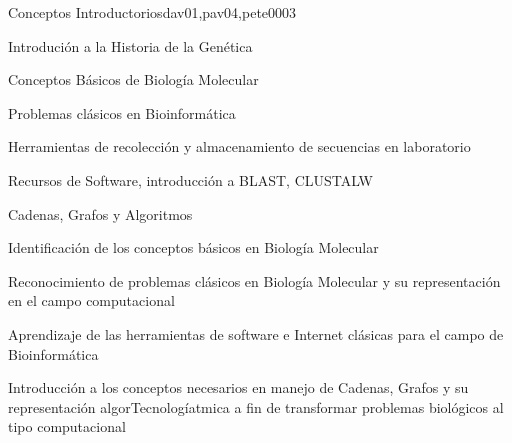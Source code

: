 \begin{syllabus}
\begin{unit}{Conceptos Introductorios}{dav01,pav04,pete00}{0}{3}
\begin{topics}
        \item Introdución a la Historia de la Genética
        \item Conceptos Básicos de Biología Molecular
        \item Problemas clásicos en Bioinformática
        \item Herramientas de recolección y almacenamiento de secuencias en laboratorio
        \item Recursos de Software, introducción a BLAST, CLUSTALW
        \item Cadenas, Grafos y Algoritmos
    \end{topics}
    \begin{unitgoals}
        \item Identificación de los conceptos básicos en Biología Molecular
        \item Reconocimiento de problemas clásicos en Biología Molecular y su representación en el campo computacional
        \item Aprendizaje de las herramientas de software e Internet clásicas para el campo de Bioinformática
        \item Introducción a los conceptos necesarios en manejo de Cadenas, Grafos y su representación algorTecnologíatmica a fin de transformar problemas biológicos al tipo computacional
    \end{unitgoals}
\end{unit}


\end{syllabus}
